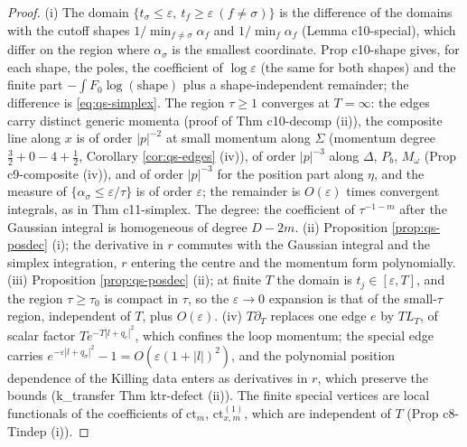 \begin{proof}
(i) The domain $\{t_\sigma\le\varepsilon,\ t_f\ge\varepsilon\ (f\ne\sigma)\}$ is the difference of the domains with the cutoff shapes $1/\min_{f\ne\sigma}\alpha_f$ and $1/\min_f\alpha_f$ (Lemma c10-special), which differ on the region where $\alpha_\sigma$ is the smallest coordinate. Prop c10-shape gives, for each shape, the poles, the coefficient of $\log\varepsilon$ (the same for both shapes) and the finite part $-\int F_0\log(\text{shape})$ plus a shape-independent remainder; the difference is \eqref{eq:qs-simplex}. The region $\tau\ge1$ converges at $T=\infty$: the edges carry distinct generic momenta (proof of Thm c10-decomp (ii)), the composite line along $x$ is of order $|p|^{-2}$ at small momentum along $\Sigma$ (momentum degree $\tfrac32+0-4+\tfrac12$, Corollary \ref{cor:qs-edges} (iv)), of order $|p|^{-3}$ along $\Delta$, $P_b$, $M_\omega$ (Prop c9-composite (iv)), and of order $|p|^{-3}$ for the position part along $\eta$, and the measure of $\{\alpha_\sigma\le\varepsilon/\tau\}$ is of order $\varepsilon$; the remainder is $O(\varepsilon)$ times convergent integrals, as in Thm c11-simplex. The degree: the coefficient of $\tau^{-1-m}$ after the Gaussian integral is homogeneous of degree $D-2m$. (ii) Proposition \ref{prop:qs-posdec} (i); the derivative in $r$ commutes with the Gaussian integral and the simplex integration, $r$ entering the centre and the momentum form polynomially. (iii) Proposition \ref{prop:qs-posdec} (ii); at finite $T$ the domain is $t_j\in[\varepsilon,T]$, and the region $\tau\ge\tau_0$ is compact in $\tau$, so the $\varepsilon\to0$ expansion is that of the small-$\tau$ region, independent of $T$, plus $O(\varepsilon)$. (iv) $T\partial_T$ replaces one edge $e$ by $TL_T$, of scalar factor $Te^{-T|l+q_e|^2}$, which confines the loop momentum; the special edge carries $e^{-\varepsilon|l+q_\sigma|^2}-1=O(\varepsilon(1+|l|)^2)$, and the polynomial position dependence of the Killing data enters as derivatives in $r$, which preserve the bounds (k\_transfer Thm ktr-defect (ii)). The finite special vertices are local functionals of the coefficients of $\mathrm{ct}_m$, $\mathrm{ct}^{(1)}_{x,m}$, which are independent of $T$ (Prop c8-Tindep (i)).
\end{proof}

